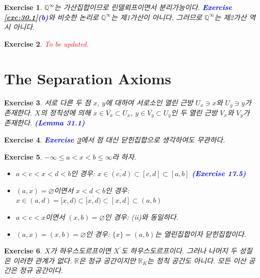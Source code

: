 \documentclass{article}
\newtheorem{exercise}{Exercise}[section]
\newcommand{\Q}{\mathbb{Q}}
\newcommand{\R}{\mathbb{R}}
\begin{document}
\begin{exercise}
    $\Q^\infty$는 가산집합이므로 린델뢰프이면서 분리가능이다. \textcolor{blue}{\textbf{Exercise \ref{exc:30.1}(b)}}와 비슷한 논리로 $\Q^\infty$는 제1가산이 아니다. 그러므로 $\Q^\infty$는 제2가산 역시 아니다.
\end{exercise}

\begin{exercise}
    \textcolor{red}{To be updated.}
\end{exercise}

\section{The Separation Axioms}

\begin{exercise}
	\label{exc:31.1}
    서로 다른 두 점 $x$, $y$에 대하여 서로소인 열린 근방 $U_x\ni x$와 $U_y\ni y$가 존재한다. $X$의 정칙성에 의해 $x\in\overline{V_x}\subset U_x$, $y\in\overline{V_y}\subset U_y$인 두 열린 근방 $V_x$와 $V_y$가 존재한다. \textcolor{blue}{\textbf{(Lemma 31.1)}}
\end{exercise}

\begin{exercise}
    \textcolor{blue}{\textbf{Exercise \ref{exc:31.1}}}에서 점 대신 닫힌집합으로 생각하여도 무관하다.
\end{exercise}

\begin{exercise}
    $-\infty\leq a<x<b\leq\infty$라 하자.
    \begin{itemize}
        \item[(i)] $a<c<x<d<b$인 경우: $x\in\overline{(c,d)}\subset[c,d]\subset[a,b]$ \textcolor{blue}{\textbf{(Exercise 17.5)}}
        \item[(ii)] $(a,x)=\varnothing$이면서 $x<d<b$인 경우: $x\in(a,d)=[x,d)\subset\overline{[x,d)}\subset[x,d]\subset(a,b)$
        \item[(iii)] $a<c<x$이면서 $(x,b)=\varnothing$인 경우: (ii)와 동일하다.
        \item[(iv)] $(a,x)=(x,b)=\varnothing$인 경우: $\{x\}=(a,b)$는 열린집합이자 닫힌집합이다.
    \end{itemize}
\end{exercise}

\begin{exercise}
    $X$가 하우스도르프이면 $X^\prime$도 하우스도르프이다. 그러나 나머지 두 성질은 이러한 관계가 없다. $\R$은 정규 공간이지만 $\R_K$는 정칙 공간도 아니다. 모든 이산 공간은 정규 공간이다.
\end{exercise}
\end{document}
